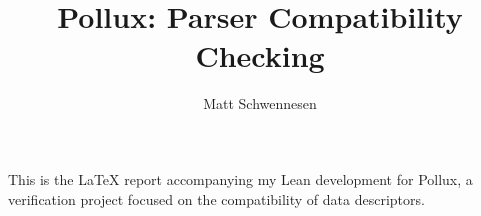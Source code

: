 \documentclass[11pt]{article}
\author{Matt Schwennesen}
\title{Pollux: Parser Compatibility Checking}
\date{}
\theoremstyle{definition}
\theoremstyle{lemma}
\theoremstyle{plain}
\begin{document}
\maketitle

This is the \LaTeX{} report accompanying my Lean development for Pollux,
a verification project focused on the compatibility of data
descriptors.

\tableofcontents














% 









\printbibliography{}
\end{document}
